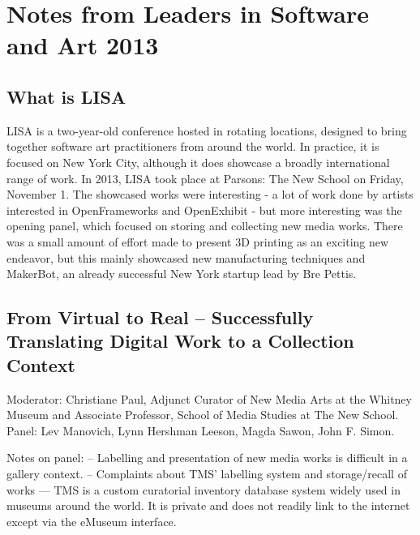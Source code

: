 
\chapter{Notes from Leaders in Software and Art 2013} %

\label{LISAnotes} %



\section{What is LISA}
LISA is a two-year-old conference hosted in rotating locations, designed to bring together software art practitioners from around the world. In practice, it is focused on New York City, although it does showcase a broadly international range of work. In 2013, LISA took place at Parsons: The New School on Friday, November 1. The showcased works were interesting - a lot of work done by artists interested in OpenFrameworks and OpenExhibit - but more interesting was the opening panel, which focused on storing and collecting new media works. There was a small amount of effort made to present 3D printing as an exciting new endeavor, but this mainly showcased new manufacturing techniques and MakerBot, an already successful New York startup lead by Bre Pettis.

\section{From Virtual to Real – Successfully Translating Digital Work to a Collection Context}
Moderator: Christiane Paul, Adjunct Curator of New Media Arts at the Whitney Museum and Associate Professor, School of Media Studies at The New School.
Panel: Lev Manovich, Lynn Hershman Leeson, Magda Sawon, John F. Simon.

Notes on panel:
-- Labelling and presentation of new media works is difficult in a gallery context.
-- Complaints about TMS' labelling system and storage/recall of works
--- TMS is a custom curatorial inventory database system widely used in museums around the world. It is private and does not readily link to the internet except via the eMuseum interface.

